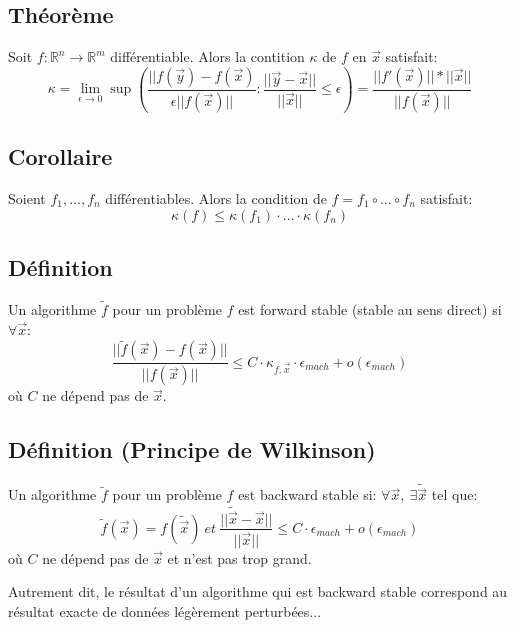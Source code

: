 \documentclass{article}
\newcommand{\R}{\mathbb{R}}
\newcommand{\y}{\vec{y}}
\newcommand{\x}{\vec{x}}
\begin{document}
\subsection{Théorème}
Soit $f: {\R}^n \rightarrow {\R}^m$ différentiable. Alors la contition $\kappa$ de $f$ en $\x$ satisfait:
$$\kappa = \lim_{\epsilon \rightarrow 0} \sup(\frac{||f(\y) - f(\x)}{\epsilon||f(\x)||}:\frac{||\y - \x||}{||\x||} \leq \epsilon) = \frac{||f'(\x)|| * ||\x||}{||f(\x)||}$$

\subsection{}

\subsection{Corollaire}
Soient $f_1, \dots, f_n$ différentiables. Alors la condition de $f = f_1 \circ \dots \circ f_n$ satisfait:
$$\kappa(f) \leq \kappa(f_1) \cdot \dots \cdot \kappa (f_n)$$

\subsection{Définition}
Un algorithme $\tilde{f}$ pour un problème $f$ est forward stable (stable au sens direct) si $\forall \x $:
$$\frac{||\tilde{f}(\x) - f(\x)||}{||f(\x)||} \leq C \cdot \kappa_{f, \x} \cdot \epsilon_{mach} + o(\epsilon_{mach})$$
où $C$ ne dépend pas de $\x$.

\subsection{}
\subsection{}
\subsection{Définition (Principe de Wilkinson)}
Un algorithme $\tilde{f}$ pour un problème $f$ est backward stable si: $\forall \x,\ \exists \tilde{\x}$ tel que:
$$\tilde{f}(\x) = f(\tilde{\x}) \ et \ \frac{||\tilde{\x} - \x||}{||\x||} \leq C \cdot \epsilon_{mach} + o(\epsilon_{mach})$$
où $C$ ne dépend pas de $\x$ et n'est pas trop grand.

Autrement dit, le résultat d'un algorithme qui est backward stable correspond au résultat exacte de données légèrement perturbées...
\end{document}
